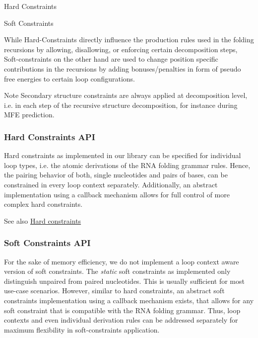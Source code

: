 \begin{DoxyItemize}
\item Hard Constraints
\item Soft Constraints
\end{DoxyItemize}

While Hard-\/\+Constraints directly influence the production rules used in the folding recursions by allowing, disallowing, or enforcing certain decomposition steps, Soft-\/constraints on the other hand are used to change position specific contributions in the recursions by adding bonuses/penalties in form of pseudo free energies to certain loop configurations.

\begin{DoxyNote}{Note}
Secondary structure constraints are always applied at decomposition level, i.\+e. in each step of the recursive structure decomposition, for instance during M\+FE prediction.
\end{DoxyNote}
\hypertarget{folding_grammar_sec_constraints_hard_api}{}\subsubsection{Hard Constraints A\+PI}\label{folding_grammar_sec_constraints_hard_api}
Hard constraints as implemented in our library can be specified for individual loop types, i.\+e. the atomic derivations of the R\+NA folding grammar rules. Hence, the pairing behavior of both, single nucleotides and pairs of bases, can be constrained in every loop context separately. Additionally, an abstract implementation using a callback mechanism allows for full control of more complex hard constraints.

\begin{DoxySeeAlso}{See also}
\hyperlink{group__hard__constraints}{Hard constraints}
\end{DoxySeeAlso}
\hypertarget{folding_grammar_sec_constraints_soft_api}{}\subsubsection{Soft Constraints A\+PI}\label{folding_grammar_sec_constraints_soft_api}
For the sake of memory efficiency, we do not implement a loop context aware version of soft constraints. The {\itshape static} soft constraints as implemented only distinguish unpaired from paired nucleotides. This is usually sufficient for most use-\/case scenarios. However, similar to hard constraints, an abstract soft constraints implementation using a callback mechanism exists, that allows for any soft constraint that is compatible with the R\+NA folding grammar. Thus, loop contexts and even individual derivation rules can be addressed separately for maximum flexibility in soft-\/constraints application.

